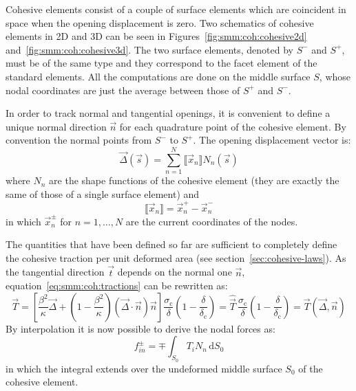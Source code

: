 Cohesive elements consist of a couple of surface elements which are
coincident in space when the opening displacement is zero. Two
schematics of cohesive elements in 2D and 3D can be seen in
Figures~\ref{fig:smm:coh:cohesive2d}
and~\ref{fig:smm:coh:cohesive3d}. The two surface elements, denoted by
$S^-$ and $S^+$, must be of the same type and they correspond to the
facet element of the standard elements. All the computations are done
on the middle surface $S$, whose nodal coordinates are just the
average between those of $S^+$ and $S^-$.

In order to track normal and tangential openings, it is convenient to
define a unique normal direction $\vec{n}$ for each quadrature point
of the cohesive element. By convention the normal points from $S^-$ to
$S^+$. The opening displacement vector is:
\begin{equation}
  \label{eq:opening_displacement}
  \vec{\Delta} (\vec{s}) = \sum_{n=1}^N \llbracket \vec{x}_n \rrbracket N_n (\vec s)
\end{equation}
where $N_n$ are the shape functions of the cohesive element (they are
exactly the same of those of a single surface element) and
\begin{equation}
  \label{eq:disp_difference}
  \llbracket \vec{x}_n \rrbracket = \vec{x}_n^+ - \vec{x}_n^-
\end{equation}
in which $\vec{x}_n^\pm$ for $n=1,\dots,N$ are the current coordinates
of the nodes.

The quantities that have been defined so far are sufficient to
completely define the cohesive traction per unit deformed area (see
section~\ref{sec:cohesive-laws}). As the tangential direction
$\vec{t}$ depends on the normal one $\vec{n}$,
equation~\eqref{eq:smm:coh:tractions} can be rewritten as:
\begin{equation}
  \vec{T} = \left[ \frac{\beta^2}{\kappa} \vec{\Delta} +
    \left( 1- \frac{\beta^2}{\kappa}\right)
    \left( \vec{\Delta} \cdot \vec{n}\right) \vec{n} \right]
  \frac{\sigma_\mathrm{c}}{\delta}
  \left( 1- \frac{\delta}{\delta_\mathrm{c}} \right)
  = \hat{\vec{T}}\,
  \frac{\sigma_\mathrm{c}}{\delta}
  \left( 1- \frac{\delta}{\delta_\mathrm{c}} \right)
  = \vec{T}(\vec{\Delta}, \vec{n})
\end{equation}
 By interpolation it is now possible to derive the nodal
forces as:
\begin{equation}
  f_{in}^\pm = \mp \int_{S_0} T_i N_n\, \mathrm{d}S_0
\end{equation}
in which the integral extends over the undeformed middle surface $S_0$
of the cohesive element.

